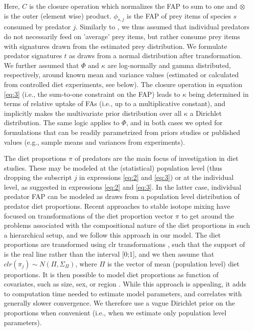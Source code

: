 \documentclass[fleqn,10pt]{wlpeerj}
\begin{document}
Here, $C$ is the closure operation which normalizes the FAP to sum to
one and $\otimes$ is the outer (element wise) product. $\phi_{s,j}$ is
the FAP of prey items of species $s$ consumed by predator
$j$. Similarly to \citet{parnell_bayesian_2012},
we thus assumed that individual predators do not necessarily feed on
'average' prey items, but rather consume prey items with
signatures drawn from the estimated prey distribution. We
formulate predator signatures $t$ as draws from a normal distribution after
transformation. We further assumed that
$\Phi$ and $\kappa$ are log-normally and gamma
distributed, respectively, around known mean and variance values (estimated or
calculated from controlled diet experiments, see below). The
closure operation in equation \eqref{eq:3} (i.e., the sum-to-one constraint
on the FAP) leads to $\kappa$ being determined in terms of
relative uptake of FAs (i.e., up to a multiplicative
constant), and implicitly makes the multivariate prior distribution over all $\kappa$ a Dirichlet
distribution. The same logic applies to $\Phi$, and in both cases we
opted for formulations that can be readily parametrized from priors
studies or published values (e.g., sample means and variances from experiments).

The diet proportions $\pi$ of predators are the main focus of investigation
in diet studies. These may be modeled at the (statistical) population
level (thus dropping the subscript $j$ in expressions \eqref{eq:2} and \eqref{eq:3}) or at the
individual level, as suggested in expressions \eqref{eq:2} and \eqref{eq:3}. In the latter case,
individual predator FAP can be modeled as draws from a population
level distribution of predator diet proportions. Recent approaches to stable
isotope mixing have focused on transformations of the diet proportion
vector $\pi$ to get around the
problems associated with the compositional nature of the diet
proportions in such a hierarchical setup, and we follow this approach
in our model. The diet proportions are transformed using clr
transformations \citep{semmens_quantifying_2009}, such that the
support of is the real line rather than the interval [0;1], and we
then assume that $clr(\pi_j) \sim N(\Pi,\Sigma_{\Pi})$, where $\Pi$ is the
vector of mean (population level) diet proportions. It is
then possible to model diet proportions as function of
covariates, such as size, sex, or region \citep[i.e., in a regression
formulation,][]{parnell_bayesian_2012}. While this approach is appealing, it adds to computation time needed
to estimate model parameters, and correlates with generally slower convergence. We therefore use a vague Dirichlet prior
on the proportions when convenient (i.e., when we estimate only
population level parameters).
\end{document}
